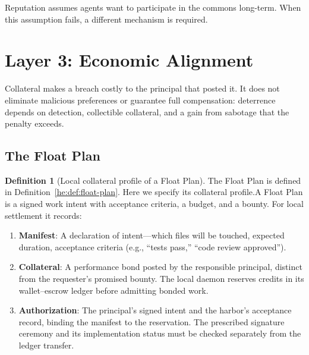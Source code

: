 \documentclass[11pt,a4paper]{article}
\theoremstyle{definition}
\newtheorem{definition}{Definition}[section]
\theoremstyle{remark}
\begin{document}
Reputation assumes agents want to participate in the commons long-term. When this assumption fails, a different mechanism is required.

\pdexercisepointerone{\ref{ex:bonded-reputation-vs-bonds}}{\pageref{ex:bonded-reputation-vs-bonds}}


\section{Layer 3: Economic Alignment}\label{sec:economic}

%
Collateral makes a breach costly to the principal that posted it. It does not eliminate malicious preferences or guarantee full compensation: deterrence depends on detection, collectible collateral, and a gain from sabotage that the penalty exceeds.

\subsection{The Float Plan}

\begin{definition}[Local collateral profile of a Float Plan]\label{def:bonded-float-plan}\label{def:float-plan}
\setlength{\parskip}{4pt plus 1pt}
\ifpdbook The Float Plan is defined in Definition~\ref{he:def:float-plan}. Here we specify its collateral profile.\else A Float Plan is a signed work intent with acceptance criteria, a budget, and a bounty.\fi
For local settlement it records:
\begin{enumerate}[nosep]
  \item \textbf{Manifest}: A declaration of intent---which files will be touched, expected duration, acceptance criteria (e.g., ``tests pass,'' ``code review approved'').
  \item \textbf{Collateral}: A performance bond posted by the responsible principal, distinct from the requester's promised bounty. The local daemon reserves credits in its wallet--escrow ledger before admitting bonded work.
  \item \textbf{Authorization}: The principal's signed intent and the harbor's acceptance record, binding the manifest to the reservation. The prescribed signature ceremony and its implementation status must be checked separately from the ledger transfer.
\end{enumerate}
\end{definition}
\end{document}
